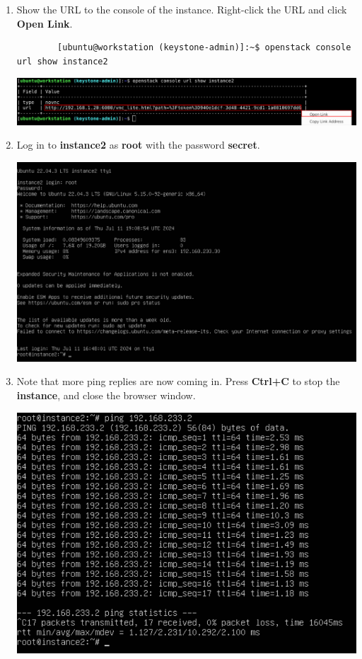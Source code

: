 \documentclass[letterpaper, 12pt]{article}
\begin{document}
\begin{enumerate}
    \item Show the URL to the console of the instance. Right-click the URL and click \textbf{Open Link}.
    \begin{lstlisting}
        [ubuntu@workstation (keystone-admin)]:~$ openstack console url show instance2
    \end{lstlisting}

    \begin{center}
        \includegraphics[width=\linewidth]{images/part4/step13.png}
    \end{center}

    \item Log in to \textbf{instance2} as \textbf{root} with the password \textbf{secret}.
    
    \begin{center}
        \includegraphics[width=\linewidth]{images/part4/step14.png}
    \end{center}

    \item Note that more ping replies are now coming in. Press \textbf{Ctrl+C} to stop the \textbf{instance}, and
    close the browser window.

    \begin{center}
        \includegraphics[width=\linewidth]{images/part4/step15.png}
    \end{center}


\end{enumerate}
\end{document}

